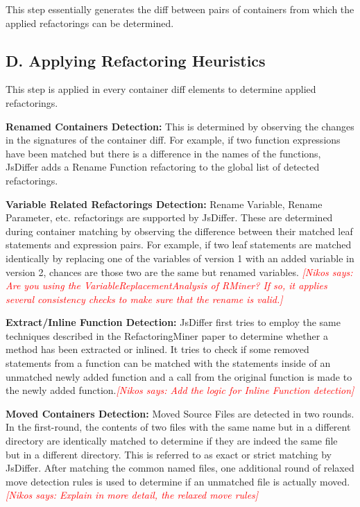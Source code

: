 \documentclass[letterpaper,12pt,onecolumn,final]{report}
\newcommand{\nikos}[1]{\textcolor{red}{{\it [Nikos says: #1]}}}
\begin{document}
This step essentially generates the diff between pairs of containers from which the applied refactorings can be determined.

\subsection *{D. Applying Refactoring Heuristics}
This step is applied in every container diff elements to determine applied refactorings.

\textbf{Renamed Containers Detection:} This is determined by observing the changes in the signatures of the container diff. For example, if two function expressions have been matched but there is a difference in the names of the functions, JsDiffer adds a Rename Function refactoring to the global list of detected refactorings.

\textbf{Variable Related Refactorings Detection:} Rename Variable, Rename Parameter, etc. refactorings are supported by JsDiffer. These are determined during container matching by observing the difference between their matched leaf statements and expression pairs. For example, if two leaf statements are matched identically by replacing one of the variables of version 1 with an added variable in version 2, chances are those two are the same but renamed variables.
\nikos{Are you using the VariableReplacementAnalysis of RMiner? If so, it applies several consistency checks to make sure that the rename is valid.}

\textbf{Extract/Inline Function Detection:} JsDiffer first tries to employ the same techniques described in the RefactoringMiner paper to determine whether a method has been extracted or inlined. It tries to check if some removed statements from a function can be matched with the statements inside of an unmatched newly added function and a call from the original function is made to the newly added function.\nikos{Add the logic for Inline Function detection}

\textbf{Moved Containers Detection:} Moved Source Files are detected in two rounds. In the first-round, the contents of two files with the same name but in a different directory are identically matched to determine if they are indeed the same file but in a different directory. This is referred to as exact or strict matching by JsDiffer. After matching the common named files, one additional round of relaxed move detection rules is used to determine if an unmatched file is actually moved.\nikos{Explain in more detail, the relaxed move rules}
\end{document}
